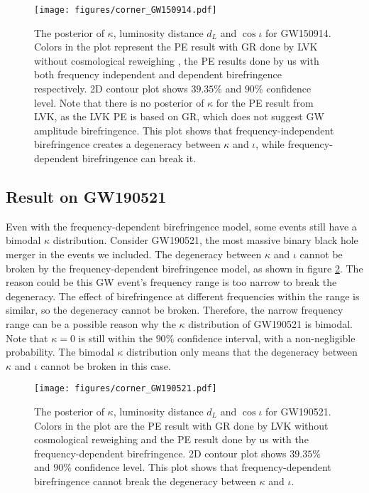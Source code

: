 \documentclass[aps,prd,twocolumn,superscriptaddress,preprintnumbers,floatfix,nofootinbib]{revtex4-2}
\begin{document}
\begin{figure}
    \texttt{[image: figures/corner\_GW150914.pdf]}
    \caption{
        The posterior of $\kappa$, luminosity distance $d_L$ and $\cos{\iota}$ for GW150914.
        Colors in the plot represent the PE result with GR done by LVK without cosmological reweighing \citep{GWTC-2.1, GWTC-3}, the PE results done by us with both frequency independent and dependent birefringence respectively.
        2D contour plot shows $39.35\%$ and $90\%$ confidence level.
        Note that there is no posterior of $\kappa$ for the PE result from LVK, as the LVK PE is based on GR, which does not suggest GW amplitude birefringence.
        This plot shows that frequency-independent birefringence creates a degeneracy between $\kappa$ and $\iota$, while frequency-dependent birefringence can break it.
    }
    \label{fig:corner_GW150914}
\end{figure}

\subsection{Result on GW190521}
Even with the frequency-dependent birefringence model, some events still have a bimodal $\kappa$ distribution.
Consider GW190521, the most massive binary black hole merger in the events we included.
The degeneracy between $\kappa$ and $\iota$ cannot be broken by the frequency-dependent birefringence model, as shown in figure \ref{fig:corner_GW190521}.
The reason could be this GW event's frequency range is too narrow to break the degeneracy.
The effect of birefringence at different frequencies within the range is similar, so the degeneracy cannot be broken.
Therefore, the narrow frequency range can be a possible reason why the $\kappa$ distribution of GW190521 is bimodal.
Note that $\kappa=0$ is still within the $90\%$ confidence interval, with a non-negligible probability.
The bimodal $\kappa$ distribution only means that the degeneracy between $\kappa$ and $\iota$ cannot be broken in this case.

\begin{figure}[h]
    \texttt{[image: figures/corner\_GW190521.pdf]}
    \caption{
        The posterior of $\kappa$, luminosity distance $d_L$ and $\cos{\iota}$ for GW190521.
        Colors in the plot are the PE result with GR done by LVK without cosmological reweighing \citep{GWTC-2.1, GWTC-3} and the PE result done by us with the frequency-dependent birefringence.
        2D contour plot shows $39.35\%$ and $90\%$ confidence level.
        This plot shows that frequency-dependent birefringence cannot break the degeneracy between $\kappa$ and $\iota$.
    }
    \label{fig:corner_GW190521}
\end{figure}
\end{document}
